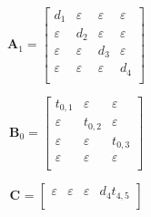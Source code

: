 \documentclass[11pt, a4paper, fleqn]{article}
\begin{document}
\begin{equation*}
\mathbf{A}_{1} = 
\left[\begin{array}{ cccc }
d_1	&\varepsilon	&\varepsilon	&\varepsilon\\
\varepsilon	&d_2	&\varepsilon	&\varepsilon\\
\varepsilon	&\varepsilon	&d_3	&\varepsilon\\
\varepsilon	&\varepsilon	&\varepsilon	&d_4\\
\end{array}\right]
\end{equation*}

\begin{equation*}
\mathbf{B}_{0} = 
\left[\begin{array}{ ccc }
t_{0,1}	&\varepsilon	&\varepsilon\\
\varepsilon	&t_{0,2}	&\varepsilon\\
\varepsilon	&\varepsilon	&t_{0,3}\\
\varepsilon	&\varepsilon	&\varepsilon\\
\end{array}\right]
\end{equation*}

\begin{equation*}
\mathbf{C}_{{}} = 
\left[\begin{array}{ cccc }
\varepsilon	&\varepsilon	&\varepsilon	&d_4t_{4,5}\\
\end{array}\right]
\end{equation*}
\end{document}
